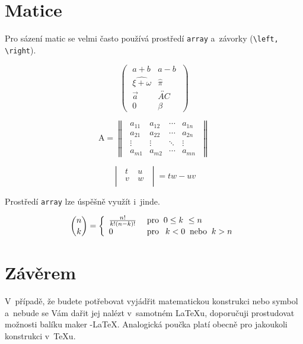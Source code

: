\documentclass[11pt,a4paper,twocolumn,oneside]{article}
\theoremstyle{definition}
\theoremstyle{plain}
\theoremstyle{plain}
\begin{document}
	\section{Matice}

Pro sázení matic se velmi často používá prostředí \verb|array| a~závorky (\verb|\left, \right|). 

\begin{center}

$$\begin{pmatrix}
  \;a+b & a-b\;  \\
  \;\widehat{\xi+\omega} & \hat{\pi}\;\\
  \;\vec{a} &  \overleftrightarrow{AC}\;\\
  \;0 & \beta\;
\end{pmatrix}$$

$$\text{A} =
 \begin{Vmatrix}
  \;a_{11} & a_{12} & \cdots & a_{1n}\; \\
  \;a_{21} & a_{22} & \cdots & a_{2n}\; \\
  \;\vdots  & \vdots  & \ddots & \vdots\;  \\
  \;a_{m1} & a_{m2} & \cdots & a_{mn}\;
 \end{Vmatrix}$$
 
 $$\begin{vmatrix}
  \;t\ & u~\;\\
  \;v~& w\; \\
 \end{vmatrix} =tw-uv$$
\end{center}

Prostředí \verb|array| lze úspěšně využít i~jinde.	\smallskip

\[  \binom{n}{k} =
\left\{
\begin{array}{ll}
    \frac{n!}{k!(n-k)!} &\; \text{pro $\:0\leq k~\leq n$}\\
    0 & \; \text{pro\: $\:k < 0\:$ nebo $\:k > n$}
  \end{array} \right.\]

	\section{Závěrem}
	
V~případě, že budete potřebovat vyjádřit matematickou konstrukci nebo symbol a~nebude se Vám dařit jej nalézt v~samotném \LaTeX u, doporučuji prostudovat možnosti balíku maker \AmS-\LaTeX.
Analogická poučka platí obecně pro jakoukoli konstrukci v~\TeX u.
\end{document}
